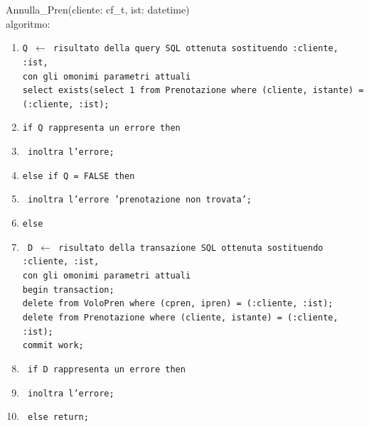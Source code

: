 \documentclass[a4paper,12pt]{report}
\begin{document}
        Annulla\_Pren(cliente: cf\_t, ist: datetime) \\
        \hspace*{1cm}algoritmo:
        \begin{enumerate}[label*=\arabic*]
          \item \texttt{Q $\leftarrow$ risultato della query SQL ottenuta sostituendo :cliente, :ist, \\
            \hspace*{2cm} con gli omonimi parametri attuali \\
            \hspace*{2cm} select exists(select 1 from Prenotazione where (cliente, istante) = (:cliente, :ist);}
          \item \texttt{if Q rappresenta un errore then}
          \item \texttt{\hspace*{1cm} inoltra l'errore;}
          \item \texttt{else if Q = FALSE then}
          \item \texttt{\hspace*{1cm} inoltra l'errore 'prenotazione non trovata';}
          \item \texttt{else}
          \item \texttt{\hspace*{1cm} D $\leftarrow$ risultato della transazione SQL ottenuta sostituendo :cliente, :ist, \\
            \hspace*{2cm} con gli omonimi parametri attuali \\
            \hspace*{2cm} begin transaction; \\
            \hspace*{2cm} delete from VoloPren where (cpren, ipren) = (:cliente, :ist); \\
            \hspace*{2cm} delete from Prenotazione where (cliente, istante) = (:cliente, :ist); \\
            \hspace*{2cm} commit work;}
          \item \texttt{\hspace*{1cm} if D rappresenta un errore then}
          \item \texttt{\hspace*{2cm} inoltra l'errore;}
          \item \texttt{\hspace*{1cm} else return;}
        \end{enumerate}
\end{document}
